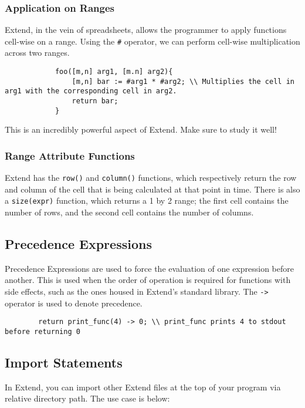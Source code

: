 		\subsubsection{Application on Ranges}
		Extend, in the vein of spreadsheets, allows the programmer to apply functions cell-wise on a range. Using the \texttt{\#} operator, we can perform cell-wise multiplication across two ranges.

		\begin{lstlisting}
			foo([m,n] arg1, [m.n] arg2){
				[m,n] bar := #arg1 * #arg2; \\ Multiplies the cell in arg1 with the corresponding cell in arg2.
				return bar;
			}
		\end{lstlisting}

		\medskip \noindent
		This is an incredibly powerful aspect of Extend. Make sure to study it well!

		\subsubsection{Range Attribute Functions}
		Extend has the \texttt{row()} and \texttt{column()} functions, which respectively return the row and column of the cell that is being calculated at that point in time.
		There is also a \texttt{size(expr)} function, which returns a 1 by 2 range; the first cell contains the number of rows, and the second cell contains the number of columns.

	\subsection{Precedence Expressions}
	Precedence Expressions are used to force the evaluation of one expression before another. This is used when the order of operation is required for functions with side effects, such as the ones housed in Extend's standard library.
	The \texttt{->} operator is used to denote precedence.

	\begin{lstlisting}
		return print_func(4) -> 0; \\ print_func prints 4 to stdout before returning 0
	\end{lstlisting}

	\subsection{Import Statements}
	In Extend, you can import other Extend files at the top of your program via relative directory path. The use case is below:

